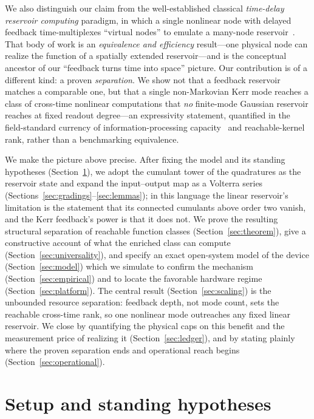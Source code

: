 \documentclass[11pt]{article}
\theoremstyle{remark}
\begin{document}
We also distinguish our claim from the well-established classical \emph{time-delay
reservoir computing} paradigm, in which a single nonlinear node with delayed
feedback time-multiplexes ``virtual nodes'' to emulate a many-node
reservoir~\cite{appeltant2011,larger2012}. That body of work is an \emph{equivalence
and efficiency} result---one physical node can realize the function of a spatially
extended reservoir---and is the conceptual ancestor of our ``feedback turns time
into space'' picture. Our contribution is of a different kind: a proven
\emph{separation}. We show not that a feedback reservoir matches a comparable one,
but that a single non-Markovian Kerr mode reaches a class of cross-time nonlinear
computations that \emph{no} finite-mode Gaussian reservoir reaches at fixed readout
degree---an expressivity statement, quantified in the field-standard currency of
information-processing capacity~\cite{dambre2012} and reachable-kernel rank, rather
than a benchmarking equivalence.

We make the picture above precise. After fixing the model and its standing
hypotheses (Section~\ref{sec:setup}), we adopt the cumulant tower of the quadratures
as the reservoir state and expand the input--output map as a Volterra series
(Sections~\ref{sec:gradings}--\ref{sec:lemmas}); in this language the linear
reservoir's limitation is the statement that its connected cumulants above order two
vanish, and the Kerr feedback's power is that it does not. We prove the resulting
structural separation of reachable function classes (Section~\ref{sec:theorem}),
give a constructive account of what the enriched class can compute
(Section~\ref{sec:universality}), and specify an exact open-system model of the
device (Section~\ref{sec:model}) which we simulate to confirm the mechanism
(Section~\ref{sec:empirical}) and to locate the favorable hardware regime
(Section~\ref{sec:platform}). The central result (Section~\ref{sec:scaling}) is the
unbounded resource separation: feedback depth, not mode count, sets the reachable
cross-time rank, so one nonlinear mode outreaches any fixed linear reservoir. We
close by quantifying the physical caps on this benefit and the measurement price of
realizing it (Section~\ref{sec:ledger}), and by stating plainly where the proven
separation ends and operational reach begins (Section~\ref{sec:operational}).

\section{Setup and standing hypotheses}
\label{sec:setup}
\end{document}
